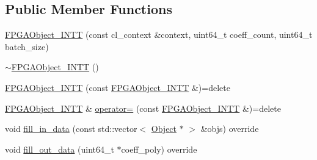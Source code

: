 \subsection*{Public Member Functions}
\begin{DoxyCompactItemize}
\item 
\hyperlink{structintel_1_1hexl_1_1fpga_1_1FPGAObject__INTT_a153585cd172743a16e84efd8659aa66c}{F\-P\-G\-A\-Object\-\_\-\-I\-N\-T\-T} (const cl\-\_\-context \&context, uint64\-\_\-t coeff\-\_\-count, uint64\-\_\-t batch\-\_\-size)
\item 
\hyperlink{structintel_1_1hexl_1_1fpga_1_1FPGAObject__INTT_a7cedf64bc8c7af8f1a77dd68e9dd2037}{$\sim$\-F\-P\-G\-A\-Object\-\_\-\-I\-N\-T\-T} ()
\item 
\hyperlink{structintel_1_1hexl_1_1fpga_1_1FPGAObject__INTT_a991d2f78abe5d44b4f98f3b4ac4da29e}{F\-P\-G\-A\-Object\-\_\-\-I\-N\-T\-T} (const \hyperlink{structintel_1_1hexl_1_1fpga_1_1FPGAObject__INTT}{F\-P\-G\-A\-Object\-\_\-\-I\-N\-T\-T} \&)=delete
\item 
\hyperlink{structintel_1_1hexl_1_1fpga_1_1FPGAObject__INTT}{F\-P\-G\-A\-Object\-\_\-\-I\-N\-T\-T} \& \hyperlink{structintel_1_1hexl_1_1fpga_1_1FPGAObject__INTT_af77e8207b17014631d1251ecf6c375f8}{operator=} (const \hyperlink{structintel_1_1hexl_1_1fpga_1_1FPGAObject__INTT}{F\-P\-G\-A\-Object\-\_\-\-I\-N\-T\-T} \&)=delete
\item 
void \hyperlink{structintel_1_1hexl_1_1fpga_1_1FPGAObject__INTT_a3af9d73a583150a06fee9288a7938e31}{fill\-\_\-in\-\_\-data} (const std\-::vector$<$ \hyperlink{structintel_1_1hexl_1_1fpga_1_1Object}{Object} $\ast$ $>$ \&objs) override
\item 
void \hyperlink{structintel_1_1hexl_1_1fpga_1_1FPGAObject__INTT_a18c10384468f7e39f15b2059fe59d5db}{fill\-\_\-out\-\_\-data} (uint64\-\_\-t $\ast$coeff\-\_\-poly) override
\end{DoxyCompactItemize}
